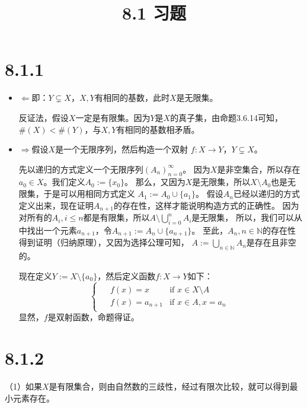 \documentclass{article}
\theoremstyle{mystyle}
\begin{document}
\title{8.1 习题}
\maketitle

\section*{8.1.1}

\begin{itemize}
  \item $\Leftarrow$即：$Y \subsetneq X$，$X,Y$有相同的基数，此时$X$是无限集。

        反证法，假设$X$一定是有限集。因为$Y$是$X$的真子集，由命题3.6.14可知，
        $\#(X) < \#(Y)$，与$X,Y$有相同的基数相矛盾。
  \item $\Rightarrow$假设$X$是一个无限序列，然后构造一个双射
        $f: X \rightarrow Y$，$Y \subsetneq X$。

        先以递归的方式定义一个无限序列$(A_n)_{n=0}^\infty$。
        因为$X$是非空集合，所以存在$a_0 \in X$。我们定义$A_0 := \{x_0\}$。
        那么，又因为$X$是无限集，所以$X \setminus A_0$也是无限集，于是可以用相同方式定义
        $A_1 := A_0 \cup \{a_1\}$。
        假设$A_n$已经以递归的方式定义出来，现在证明$A_{n+1}$的存在性，这样才能说明构造方式的正确性。
        因为对所有的$A_i, i \leq n$都是有限集，所以$A \setminus \bigcup _{i=0}^n A_i$是无限集，
        所以，我们可以从中找出一个元素$a_{n+1}$，令$A_{n+1} := A_n \cup \{a_{n+1}\}$。
        至此，$A_n, n \in \mathbb{N}$的存在性得到证明（归纳原理），又因为选择公理可知，
        $A := \bigcup _{n \in \mathbb{N}} A_n$是存在且非空的。

        现在定义$Y := X \setminus \{ a_0 \}$，然后定义函数$f: X \rightarrow Y$如下：
        \begin{equation*}
          \begin{cases*}
            \begin{aligned}
               & f(x) = x       & \text{if } x \in X \setminus A \\
               & f(x) = a_{n+1} & \text{if } x \in A, x = a_n
            \end{aligned}
          \end{cases*}
        \end{equation*}
        显然，$f$是双射函数，命题得证。




\end{itemize}

\section*{8.1.2}
（1）如果$X$是有限集合，则由自然数的三歧性，经过有限次比较，就可以得到最小元素存在。
\end{document}
